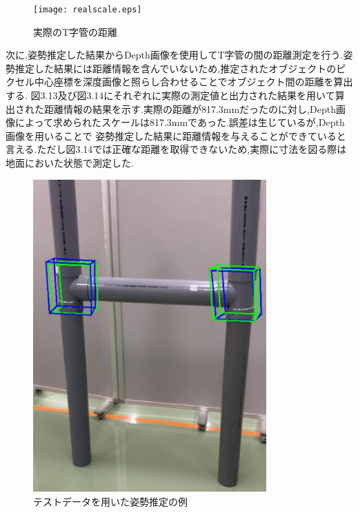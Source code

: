 \begin{figure}[htbt]
	\centering
	 \texttt{[image: realscale.eps]}
	 \caption{実際のT字管の距離}
	 \label{fig:f2}
\end{figure}

次に,姿勢推定した結果からDepth画像を使用してT字管の間の距離測定を行う.姿勢推定した結果には距離情報を含んでいないため,推定されたオブジェクトのピクセル中心座標を深度画像と照らし合わせることでオブジェクト間の距離を算出する.
図3.13及び図3.14にそれぞれに実際の測定値と出力された結果を用いて算出された距離情報の結果を示す.実際の距離が817.3mmだったのに対し,Depth画像によって求められたスケールは817.3mmであった.誤差は生じているが,Depth画像を用いることで
姿勢推定した結果に距離情報を与えることができていると言える.ただし図3.14では正確な距離を取得できないため,実際に寸法を図る際は地面においた状態で測定した.\\
\clearpage
\begin{figure}[htbt]
	\centering
	 \includegraphics[height=120mm]{test6.eps}
	 \caption{テストデータを用いた姿勢推定の例}
	 \label{fig:f2}
\end{figure}

